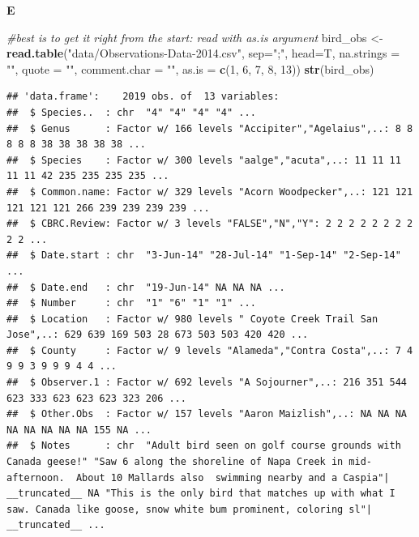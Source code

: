 \documentclass[]{book}
\newenvironment{Shaded}{\begin{snugshade}}{\end{snugshade}}
\newcommand{\CommentTok}[1]{\textcolor[rgb]{0.56,0.35,0.01}{\textit{#1}}}
\newcommand{\DataTypeTok}[1]{\textcolor[rgb]{0.13,0.29,0.53}{#1}}
\newcommand{\DecValTok}[1]{\textcolor[rgb]{0.00,0.00,0.81}{#1}}
\newcommand{\KeywordTok}[1]{\textcolor[rgb]{0.13,0.29,0.53}{\textbf{#1}}}
\newcommand{\NormalTok}[1]{#1}
\newcommand{\StringTok}[1]{\textcolor[rgb]{0.31,0.60,0.02}{#1}}
\begin{document}
\textbf{E}

\begin{Shaded}
\begin{Highlighting}[]
\CommentTok{#best is to get it right from the start: read with as.is argument}
\NormalTok{bird_obs <-}\StringTok{ }\KeywordTok{read.table}\NormalTok{(}\StringTok{"data/Observations-Data-2014.csv"}\NormalTok{,}
                                \DataTypeTok{sep=}\StringTok{";"}\NormalTok{,}
                                \DataTypeTok{head=}\NormalTok{T,}
                                \DataTypeTok{na.strings =} \StringTok{""}\NormalTok{,}
                                \DataTypeTok{quote =} \StringTok{""}\NormalTok{,}
                                \DataTypeTok{comment.char =} \StringTok{""}\NormalTok{,}
                                \DataTypeTok{as.is =} \KeywordTok{c}\NormalTok{(}\DecValTok{1}\NormalTok{, }\DecValTok{6}\NormalTok{, }\DecValTok{7}\NormalTok{, }\DecValTok{8}\NormalTok{, }\DecValTok{13}\NormalTok{))}
\KeywordTok{str}\NormalTok{(bird_obs)}
\end{Highlighting}
\end{Shaded}

\begin{verbatim}
## 'data.frame':    2019 obs. of  13 variables:
##  $ Species..  : chr  "4" "4" "4" "4" ...
##  $ Genus      : Factor w/ 166 levels "Accipiter","Agelaius",..: 8 8 8 8 8 38 38 38 38 38 ...
##  $ Species    : Factor w/ 300 levels "aalge","acuta",..: 11 11 11 11 11 42 235 235 235 235 ...
##  $ Common.name: Factor w/ 329 levels "Acorn Woodpecker",..: 121 121 121 121 121 266 239 239 239 239 ...
##  $ CBRC.Review: Factor w/ 3 levels "FALSE","N","Y": 2 2 2 2 2 2 2 2 2 2 ...
##  $ Date.start : chr  "3-Jun-14" "28-Jul-14" "1-Sep-14" "2-Sep-14" ...
##  $ Date.end   : chr  "19-Jun-14" NA NA NA ...
##  $ Number     : chr  "1" "6" "1" "1" ...
##  $ Location   : Factor w/ 980 levels " Coyote Creek Trail San Jose",..: 629 639 169 503 28 673 503 503 420 420 ...
##  $ County     : Factor w/ 9 levels "Alameda","Contra Costa",..: 7 4 9 9 3 9 9 9 4 4 ...
##  $ Observer.1 : Factor w/ 692 levels "A Sojourner",..: 216 351 544 623 333 623 623 623 323 206 ...
##  $ Other.Obs  : Factor w/ 157 levels "Aaron Maizlish",..: NA NA NA NA NA NA NA NA 155 NA ...
##  $ Notes      : chr  "Adult bird seen on golf course grounds with Canada geese!" "Saw 6 along the shoreline of Napa Creek in mid-afternoon.  About 10 Mallards also  swimming nearby and a Caspia"| __truncated__ NA "This is the only bird that matches up with what I saw. Canada like goose, snow white bum prominent, coloring sl"| __truncated__ ...
\end{verbatim}
\end{document}
